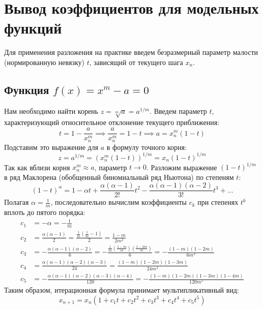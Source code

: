 \documentclass[12pt, a4paper]{article}
\theoremstyle{definition}
\begin{document}
\section{Вывод коэффициентов для модельных функций}
Для применения разложения на практике введем безразмерный параметр малости (нормированную невязку) $t$, зависящий от текущего шага $x_n$.

\subsection{Функция $f(x) = x^m - a = 0$}
Нам необходимо найти корень $z = \sqrt[m]{a} = a^{1/m}$. 
Введем параметр $t$, характеризующий относительное отклонение текущего приближения:
\[
t = 1 - \frac{a}{x_n^m} \implies \frac{a}{x_n^m} = 1 - t \implies a = x_n^m(1 - t)
\]
Подставим это выражение для $a$ в формулу точного корня:
\[
z = a^{1/m} = \left( x_n^m(1 - t) \right)^{1/m} = x_n (1 - t)^{1/m}
\]
Так как вблизи корня $x_n^m \approx a$, параметр $t \to 0$. Разложим выражение $(1 - t)^{1/m}$ в ряд Маклорена (обобщенный биномиальный ряд Ньютона) по степеням $t$:
\[
(1 - t)^\alpha = 1 - \alpha t + \frac{\alpha(\alpha - 1)}{2!} t^2 - \frac{\alpha(\alpha - 1)(\alpha - 2)}{3!} t^3 + \dots
\]
Полагая $\alpha = \frac{1}{m}$, последовательно вычислим коэффициенты $c_k$ при степенях $t^k$ вплоть до пятого порядка:
\begin{align*}
c_1 &= -\alpha = -\frac{1}{m} \\
c_2 &= \frac{\alpha(\alpha-1)}{2} = \frac{\frac{1}{m}\left(\frac{1}{m}-1\right)}{2} = \frac{1 - m}{2m^2} \\
c_3 &= -\frac{\alpha(\alpha-1)(\alpha-2)}{6} = -\frac{\frac{1}{m}\left(\frac{1-m}{m}\right)\left(\frac{1-2m}{m}\right)}{6} = -\frac{(1 - m)(1 - 2m)}{6m^3} \\
c_4 &= \frac{\alpha(\alpha-1)(\alpha-2)(\alpha-3)}{24} = \frac{(1 - m)(1 - 2m)(1 - 3m)}{24m^4} \\
c_5 &= -\frac{\alpha(\alpha-1)(\alpha-2)(\alpha-3)(\alpha-4)}{120} = -\frac{(1 - m)(1 - 2m)(1 - 3m)(1 - 4m)}{120m^5}
\end{align*}
Таким образом, итерационная формула принимает мультипликативный вид:
\[
x_{n+1} = x_n \left( 1 + c_1 t + c_2 t^2 + c_3 t^3 + c_4 t^4 + c_5 t^5 \right)
\]
\end{document}

